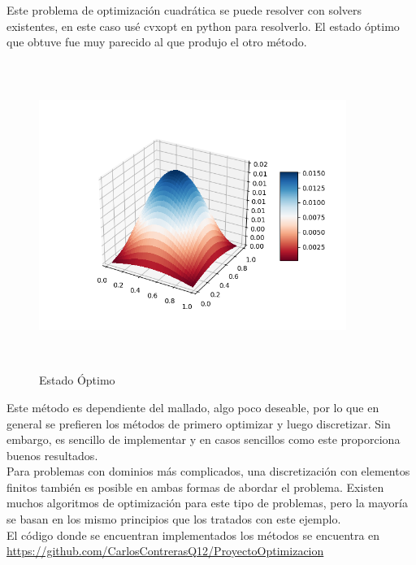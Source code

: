 \documentclass{article}
\begin{document}
Este problema de optimización cuadrática se puede resolver con solvers existentes, en este caso usé cvxopt en python para resolverlo. El estado óptimo que obtuve fue muy parecido al que produjo el otro método.
\begin{figure}[H]
    \centering
    \includegraphics[width=10cm, height=10cm]{cuadratica.png}
    \caption{Estado Óptimo}
    \label{fig:my_label}
\end{figure}
\noindent
Este método es dependiente del mallado, algo poco deseable, por lo que en general se prefieren los métodos de primero optimizar y luego discretizar. Sin embargo, es sencillo de implementar y en casos sencillos como este proporciona buenos resultados.\\

\noindent
Para problemas con dominios más complicados, una discretización con elementos finitos también es posible en ambas formas de abordar el problema. Existen muchos algoritmos de optimización para este tipo de problemas, pero la mayoría se basan en los mismo principios que los tratados con este ejemplo. \\

\noindent
El código donde se encuentran implementados los métodos se encuentra en \url{https://github.com/CarlosContrerasQ12/ProyectoOptimizacion}








\nocite{*}


\end{document}

